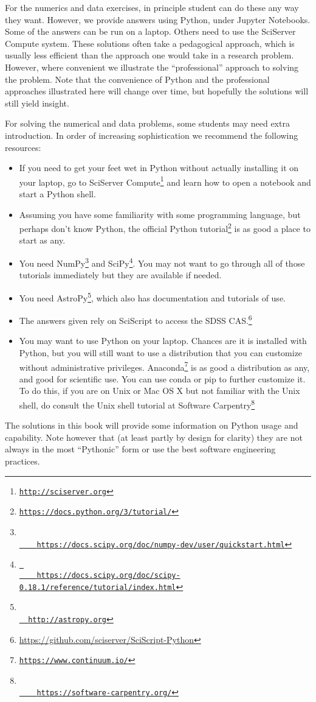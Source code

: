 \documentclass[11pt, preprint, maxnames=9]{aastex}
\begin{document}
For the numerics and data exercises, in principle student can do these
any way they want. However, we provide answers using Python, under
Jupyter Notebooks. Some of the answers can be run on a laptop. Others
need to use the SciServer Compute system.  These solutions often take
a pedagogical approach, which is usually less efficient than the
approach one would take in a research problem.  However, where
convenient we illustrate the ``professional'' approach to solving the
problem. Note that the convenience of Python and the professional
approaches illustrated here will change over time, but hopefully the
solutions will still yield insight.

For solving the numerical and data problems, some students may need
extra introduction. In order of increasing sophistication we recommend
the following resources:
\begin{itemize}
\item If you need to get your feet wet in Python without actually
  installing it on your laptop, go to SciServer
  Compute\footnote{\tt \url{http://sciserver.org}} and learn how to
  open a notebook and start a Python shell.
\item Assuming you have some familiarity with some programming
  language, but perhaps don't know Python, the official Python
  tutorial\footnote{\tt \url{https://docs.python.org/3/tutorial/}} is as
  good a place to start as any.
\item You need 
  NumPy\footnote{\tt \url{
    https://docs.scipy.org/doc/numpy-dev/user/quickstart.html}} and
  SciPy\footnote{\tt \url{ 
    https://docs.scipy.org/doc/scipy-0.18.1/reference/tutorial/index.html}}. You
  may not want to go through all of those tutorials immediately but
  they are available if needed. 
\item You need AstroPy\footnote{\tt \url{
  http://astropy.org}}, which also has documentation and tutorials of
  use.
\item The answers given rely on SciScript to access the SDSS
  CAS.\footnote{\url{https://github.com/sciserver/SciScript-Python}}
\item You may want to use Python on your laptop. Chances are it is
  installed with Python, but you will still want to use a distribution
  that you can customize without administrative
  privileges. Anaconda\footnote{\tt \url{https://www.continuum.io/}} is as
  good a distribution as any, and good for scientific use. You can use
  conda or pip to further customize it. To do this, if you are on Unix
  or Mac OS X but not familiar with the Unix shell, do consult the
  Unix shell tutorial at Software Carpentry\footnote{\tt \url{
    https://software-carpentry.org/}}
\end{itemize}
The solutions in this book will provide some information on Python
usage and capability. Note however that (at least partly by design for
clarity) they are not always in the most ``Pythonic'' form or use the
best software engineering practices.
\end{document}
